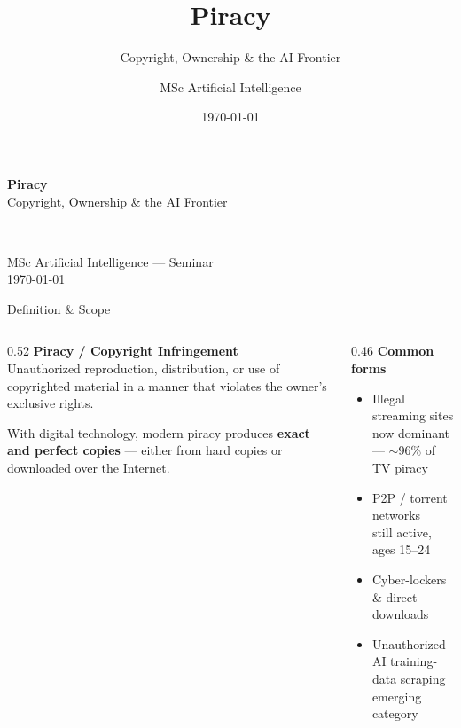 \documentclass[aspectratio=169,11pt]{beamer}
\title[Piracy in the Digital Age]{Piracy}
\subtitle{Copyright, Ownership \& the AI Frontier}
\author{MSc Artificial Intelligence}
\date{\today}
\begin{document}
	
	\begin{frame}[plain]
		\centering
		\vspace{1.4cm}
		{\Huge\bfseries Piracy}\\[0.35cm]
		{\Large Copyright, Ownership \& the AI Frontier}\\[0.9cm]
		\textcolor{ctpSurface2}{\rule{5cm}{0.6pt}}\\[0.6cm]
		{\color{ctpSubtext}\large MSc Artificial Intelligence --- Seminar}\\[0.25cm]
		{\color{ctpOverlay0}\small \today}
	\end{frame}
	
	\begin{frame}{Definition \& Scope}
		\begin{columns}[T,onlytextwidth]
			\begin{column}{0.52\textwidth}
				\textbf{\color{ctpMauve}Piracy / Copyright Infringement}\\[0.2cm]
				Unauthorized reproduction, distribution, or use of copyrighted material in a manner that violates the owner's \alert{exclusive rights}.\\[0.4cm]
				\begin{infobox}
					With digital technology, modern piracy produces \textbf{exact and perfect copies} --- either from hard copies or downloaded over the Internet.
				\end{infobox}
			\end{column}
			\begin{column}{0.46\textwidth}
				\textbf{\color{ctpMauve}Common forms}\\[0.2cm]
				\begin{itemize}\itemsep0.35em
					\item[\faTv] Illegal streaming sites\\
					{\footnotesize\color{ctpOverlay1}now dominant --- $\sim$96\% of TV piracy}
					\item[\faShareAlt] P2P / torrent networks\\
					{\footnotesize\color{ctpOverlay1}still active, ages 15--24}
					\item[\faCloudDownloadAlt] Cyber-lockers \& direct downloads
					\item[\faRobot] Unauthorized AI training-data scraping\\
					{\footnotesize\color{ctpOverlay1}emerging category}
				\end{itemize}
			\end{column}
		\end{columns}
	\end{frame}
	
\end{document}
